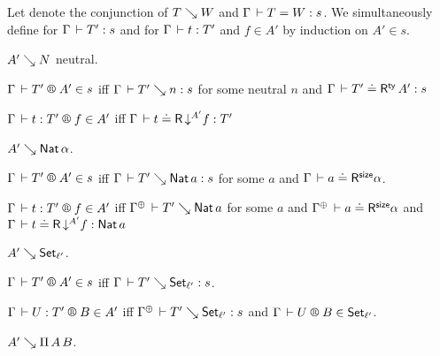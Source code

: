 \documentclass[acmlarge,review,anonymous]{acmart}\settopmatter{printfolios=true}
\begin{document}
Let  denote the conjunction of $T \evalsto W$ and $\Gamma \der T = W : s$.
We simultaneously define
 for $\Gamma \der T' : s$
and  for $\Gamma \der t : T'$ and $f \in A'$
by induction on ${A'} \in s$.

\begin{caselist}

\vspace{2ex}
\nextcase $A' \evalsto N$ neutral.

  \noindent
  $\LRTS{\Gamma}{T'}{A'} s$ iff
  $\Gamma \der T' \evalsto n : s$ for some neutral $n$ and
  $\Gamma \der T' \doteq \tRty\,A' : s$

  \noindent
  $\LR{\Gamma}{t}{T'}{f}{A'}$ iff
  $\Gamma \der t \doteq \tR \, \down {A'} f : T'$

\vspace{2ex}
\nextcase $A' \evalsto \Nat \alpha$.

  \noindent
  $\LRTS{\Gamma}{T'}{A'} s$ iff $\Gamma \der T' \evalsto \Nat a : s$ for some $a$ and $\LRSize \Gamma a \alpha$.

  \noindent
  $\LR{\Gamma}{t}{T'}{f}{A'}$ iff $\resurrect\Gamma \der T' \evalsto \Nat a$ for some $a$ and
  $\LRSize {\resurrect\Gamma} a \alpha$ and
  $\Gamma \der t \doteq \tR\,\down{A'} f : \Nat a$


\vspace{2ex}
\nextcase $A' \evalsto \Set[\ell']$.

  \noindent
  $\LRTS {\Gamma} {T'} {A'} s$ iff $\Gamma \der T' \evalsto \Set[\ell'] : s$.

  \noindent
  $\LR \Gamma U {T'} B {A'}$ iff
  $\resurrect\Gamma \der T' \evalsto \Set[\ell'] : s$ and $\LRT \Gamma U B {\ell'}$.

\vspace{2ex}
\nextcase $A' \evalsto \piT A B$.


\end{caselist}
\end{document}
